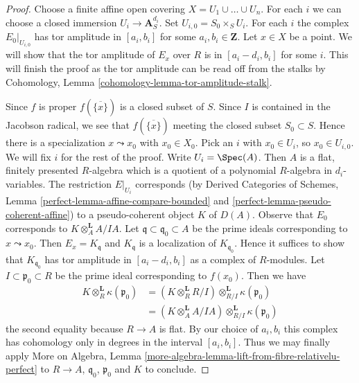 \begin{proof}
Choose a finite affine open covering $X = U_1 \cup \ldots \cup U_n$.
For each $i$ we can choose a closed immersion $U_i \to \mathbf{A}^{d_i}_S$.
Set $U_{i, 0} = S_0 \times_S U_i$.
For each $i$ the complex $E_0|_{U_{i, 0}}$ has tor amplitude
in $[a_i, b_i]$ for some $a_i, b_i \in \mathbf{Z}$.
Let $x \in X$ be a point.
We will show that the tor amplitude of
$E_x$ over $R$ is in $[a_i - d_i, b_i]$ for some $i$.
This will finish the proof as the tor amplitude can be
read off from the stalks by
Cohomology, Lemma \ref{cohomology-lemma-tor-amplitude-stalk}.

\medskip\noindent
Since $f$ is proper $f(\overline{\{x\}})$ is a closed subset of $S$.
Since $I$ is contained in the Jacobson radical, we see that
$f(\overline{\{x\}})$ meeting the closed subset $S_0 \subset S$.
Hence there is a specialization $x \leadsto x_0$ with $x_0 \in X_0$.
Pick an $i$ with $x_0 \in U_i$, so $x_0 \in U_{i, 0}$.
We will fix $i$ for the rest of the proof.
Write $U_i = \Spec(A)$. Then $A$ is a flat, finitely presented
$R$-algebra which is a quotient of a polynomial $R$-algebra in
$d_i$-variables. The restriction $E|_{U_i}$ corresponds
(by Derived Categories of Schemes, Lemma
\ref{perfect-lemma-affine-compare-bounded} and
\ref{perfect-lemma-pseudo-coherent-affine})
to a pseudo-coherent object $K$ of $D(A)$.
Observe that $E_0$ corresponds to $K \otimes_A^\mathbf{L} A/IA$.
Let $\mathfrak q \subset \mathfrak q_0 \subset A$ be the prime
ideals corresponding to $x \leadsto x_0$.
Then $E_x = K_{\mathfrak q}$ and $K_{\mathfrak q}$
is a localization of $K_{\mathfrak q_0}$. Hence it suffices
to show that $K_{\mathfrak q_0}$ has tor amplitude in
$[a_i - d_i, b_i]$ as a complex of $R$-modules.
Let $I \subset \mathfrak p_0 \subset R$ be the prime
ideal corresponding to $f(x_0)$.
Then we have
\begin{align*}
K \otimes_R^\mathbf{L} \kappa(\mathfrak p_0)
& =
(K \otimes_R^\mathbf{L} R/I) \otimes_{R/I}^\mathbf{L}
\kappa(\mathfrak p_0) \\
& =
(K \otimes_A^\mathbf{L} A/IA) \otimes_{R/I}^\mathbf{L} \kappa(\mathfrak p_0)
\end{align*}
the second equality because $R \to A$ is flat.
By our choice of $a_i, b_i$ this complex has cohomology
only in degrees in the interval $[a_i, b_i]$.
Thus we may finally apply
More on Algebra, Lemma
\ref{more-algebra-lemma-lift-from-fibre-relativelu-perfect}
to $R \to A$, $\mathfrak q_0$, $\mathfrak p_0$ and $K$
to conclude.
\end{proof}










